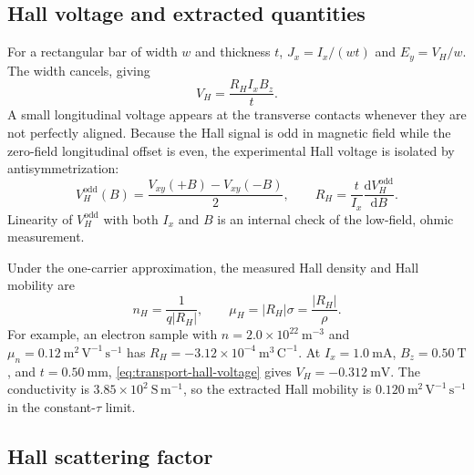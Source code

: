 \subsection{Hall voltage and extracted quantities}

For a rectangular bar of width $w$ and thickness $t$,
$J_x=I_x/(wt)$ and $E_y=V_H/w$.  The width cancels, giving
\begin{equation}
  V_H=\frac{R_H I_xB_z}{t}.
  \label{eq:transport-hall-voltage}
\end{equation}
A small longitudinal voltage appears at the transverse contacts whenever they
are not perfectly aligned.  Because the Hall signal is odd in magnetic field
while the zero-field longitudinal offset is even, the experimental Hall
voltage is isolated by antisymmetrization:
\begin{equation}
  V_H^{\mathrm{odd}}(B)
  =\frac{V_{xy}(+B)-V_{xy}(-B)}{2},
  \qquad
  R_H=\frac{t}{I_x}\frac{\mathrm dV_H^{\mathrm{odd}}}{\mathrm dB}.
  \label{eq:transport-hall-antisymmetrization}
\end{equation}
Linearity of $V_H^{\mathrm{odd}}$ with both $I_x$ and $B$ is an internal check
of the low-field, ohmic measurement.

Under the one-carrier approximation, the measured Hall density and Hall
mobility are
\begin{equation}
  n_H=\frac1{q|R_H|},
  \qquad
  \boxed{\mu_H=|R_H|\sigma=\frac{|R_H|}{\rho}.}
  \label{eq:transport-hall-mobility}
\end{equation}
For example, an electron sample with $n=2.0\times10^{22}\ \mathrm{m^{-3}}$
and $\mu_n=0.12\ \mathrm{m^2\,V^{-1}\,s^{-1}}$ has
$R_H=-3.12\times10^{-4}\ \mathrm{m^3\,C^{-1}}$.  At
$I_x=1.0\ \mathrm{mA}$, $B_z=0.50\ \mathrm T$, and
$t=0.50\ \mathrm{mm}$, \cref{eq:transport-hall-voltage} gives
$V_H=-0.312\ \mathrm{mV}$.  The conductivity is
$3.85\times10^2\ \mathrm{S\,m^{-1}}$, so the extracted Hall mobility is
$0.120\ \mathrm{m^2\,V^{-1}\,s^{-1}}$ in the constant-$\tau$ limit.

\subsection{Hall scattering factor}

